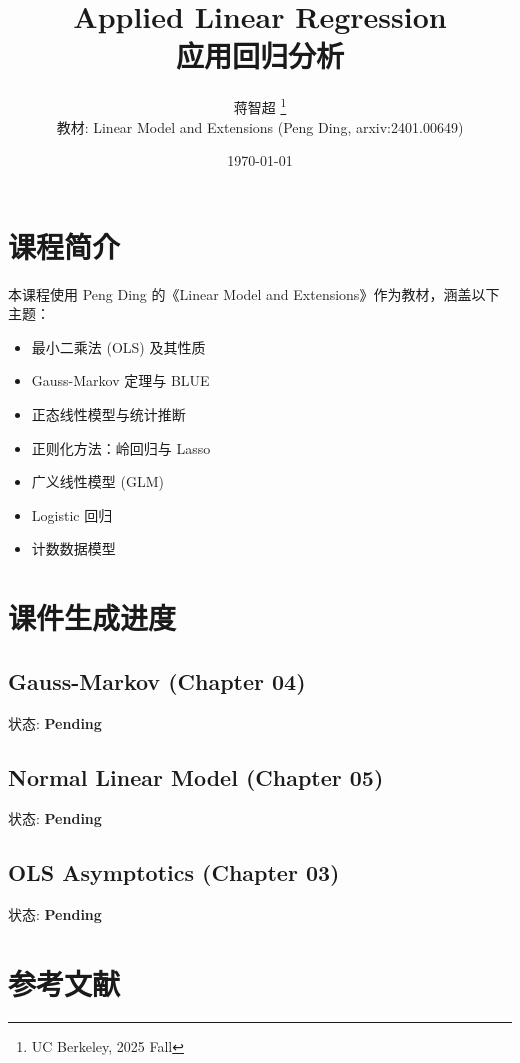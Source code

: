 \documentclass[11pt]{article}
\title{Applied Linear Regression \\ 应用回归分析}
\author{蒋智超 \thanks{UC Berkeley, 2025 Fall} \\
        \normalsize 教材: Linear Model and Extensions (Peng Ding, arxiv:2401.00649)}
\date{\today}
\begin{document}
\maketitle

\tableofcontents

\section{课程简介}

本课程使用 Peng Ding 的《Linear Model and Extensions》作为教材，涵盖以下主题：

\begin{itemize}
\item 最小二乘法 (OLS) 及其性质
\item Gauss-Markov 定理与 BLUE
\item 正态线性模型与统计推断
\item 正则化方法：岭回归与 Lasso
\item 广义线性模型 (GLM)
\item Logistic 回归
\item 计数数据模型
\end{itemize}

\section{课件生成进度}

\subsection{Gauss-Markov (Chapter 04)}
状态: \textbf{Pending}

\subsection{Normal Linear Model (Chapter 05)}
状态: \textbf{Pending}

\subsection{OLS Asymptotics (Chapter 03)}
状态: \textbf{Pending}

\section{参考文献}



\end{document}

